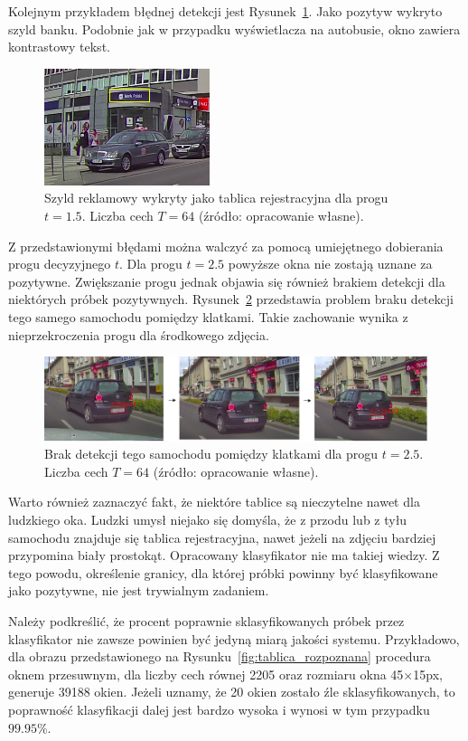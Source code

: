 \FloatBarrier
Kolejnym przykładem błędnej detekcji jest Rysunek~\ref{fig:bank}.
Jako pozytyw wykryto szyld banku.
Podobnie jak w przypadku wyświetlacza na autobusie, okno zawiera kontrastowy tekst.
\begin{figure}[!ht]
    \centering
    \includegraphics[scale=1]{Pictures/bank}
    \caption{Szyld reklamowy wykryty jako tablica rejestracyjna dla progu $t=1.5$. Liczba cech $T=64$ (źródło: opracowanie własne).}
    \label{fig:bank}
\end{figure}
\FloatBarrier
Z przedstawionymi błędami można walczyć za pomocą umiejętnego dobierania progu decyzyjnego $t$.
Dla progu $t=2.5$ powyższe okna nie zostają uznane za pozytywne.
Zwiększanie progu jednak objawia się również brakiem detekcji dla niektórych próbek pozytywnych.
Rysunek~\ref{fig:same_car} przedstawia problem braku detekcji tego samego samochodu pomiędzy klatkami.
Takie zachowanie wynika z nieprzekroczenia progu dla środkowego zdjęcia.
\begin{figure}[!ht]
    \centering
    \includegraphics[scale=0.4]{Pictures/same_car}
    \caption{Brak detekcji tego samochodu pomiędzy klatkami dla progu $t=2.5$. Liczba cech $T=64$ (źródło: opracowanie własne).}
    \label{fig:same_car}
\end{figure}
\FloatBarrier
Warto również zaznaczyć fakt, że niektóre tablice są nieczytelne nawet dla ludzkiego oka.
Ludzki umysł niejako się domyśla, że z przodu lub z tyłu samochodu znajduje się tablica rejestracyjna, nawet jeżeli na zdjęciu bardziej przypomina biały prostokąt.
Opracowany klasyfikator nie ma takiej wiedzy.
Z tego powodu, określenie granicy, dla której próbki powinny być klasyfikowane jako pozytywne, nie jest trywialnym zadaniem.

Należy podkreślić, że procent poprawnie sklasyfikowanych próbek przez klasyfikator nie zawsze powinien być jedyną miarą jakości systemu.
Przykładowo, dla obrazu przedstawionego na Rysunku~\ref{fig:tablica_rozpoznana} procedura oknem przesuwnym, dla liczby cech równej 2205 oraz rozmiaru okna
45$\times$15px, generuje 39188 okien.
Jeżeli uznamy, że 20 okien zostało źle sklasyfikowanych, to poprawność klasyfikacji dalej jest bardzo wysoka i wynosi w tym przypadku $99.95\%$.



